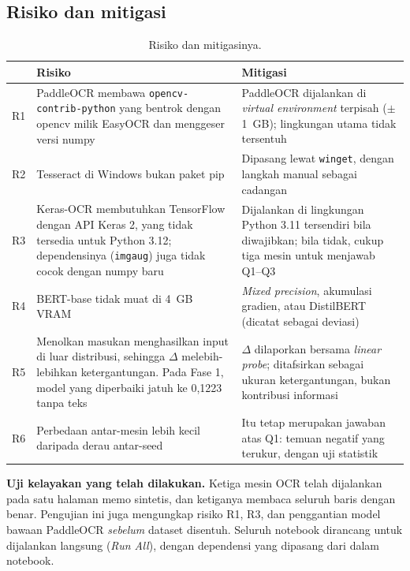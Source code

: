 \documentclass[11pt,a4paper]{article}
\begin{document}
\subsection{Risiko dan mitigasi}\label{sec:risiko}

\begin{table}[H]
\centering\small
\caption{Risiko dan mitigasinya.}
\begin{tabularx}{\textwidth}{@{}p{0.6cm} P{5.4cm} L@{}}
\toprule
& Risiko & Mitigasi \\
\midrule
R1 & PaddleOCR membawa \texttt{opencv-contrib-python} yang bentrok dengan opencv milik
EasyOCR dan menggeser versi numpy & PaddleOCR dijalankan di \textit{virtual
environment} terpisah ($\pm$1~GB); lingkungan utama tidak tersentuh \\
R2 & Tesseract di Windows bukan paket pip & Dipasang lewat \texttt{winget}, dengan
langkah manual sebagai cadangan \\
R3 & Keras-OCR membutuhkan TensorFlow dengan API Keras 2, yang tidak tersedia untuk
Python 3.12; dependensinya (\texttt{imgaug}) juga tidak cocok dengan numpy baru &
Dijalankan di lingkungan Python 3.11 tersendiri bila diwajibkan; bila tidak, cukup
tiga mesin untuk menjawab Q1--Q3 \\
R4 & BERT-base tidak muat di 4~GB VRAM & \textit{Mixed precision}, akumulasi gradien,
atau DistilBERT (dicatat sebagai deviasi) \\
R5 & Menolkan masukan menghasilkan input di luar distribusi, sehingga
$\Delta$ melebih-lebihkan ketergantungan. Pada Fase 1, model yang diperbaiki jatuh ke
0,1223 tanpa teks & $\Delta$ dilaporkan bersama \textit{linear probe}; ditafsirkan
sebagai ukuran ketergantungan, bukan kontribusi informasi \\
R6 & Perbedaan antar-mesin lebih kecil daripada derau antar-seed & Itu tetap merupakan
jawaban atas Q1: temuan negatif yang terukur, dengan uji statistik \\
\bottomrule
\end{tabularx}
\end{table}

\noindent\textbf{Uji kelayakan yang telah dilakukan.} Ketiga mesin OCR telah dijalankan
pada satu halaman memo sintetis, dan ketiganya membaca seluruh baris dengan benar.
Pengujian ini juga mengungkap risiko R1, R3, dan penggantian model bawaan PaddleOCR
\emph{sebelum} dataset disentuh. Seluruh notebook dirancang untuk dijalankan langsung
(\textit{Run All}), dengan dependensi yang dipasang dari dalam notebook.
\end{document}
